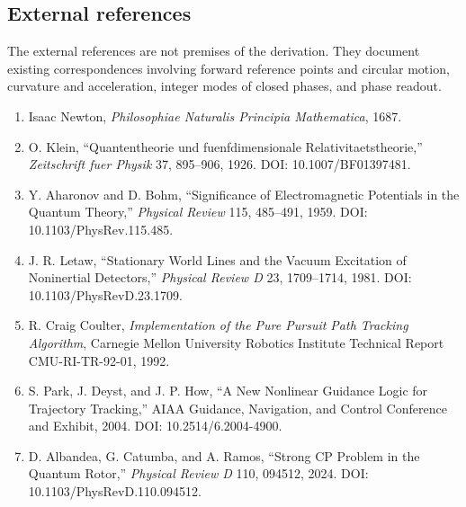 \documentclass[
  a4paper,
]{article}
\providecommand{\tightlist}{%
  \setlength{\itemsep}{0pt}\setlength{\parskip}{0pt}}
\begin{document}
\subsection{External references}\label{external-references}

The external references are not premises of the derivation. They
document existing correspondences involving forward reference points and
circular motion, curvature and acceleration, integer modes of closed
phases, and phase readout.

\begin{enumerate}
\def\labelenumi{\arabic{enumi}.}
\setcounter{enumi}{5}
\tightlist
\item
  Isaac Newton, \emph{Philosophiae Naturalis Principia Mathematica},
  1687.
\item
  O. Klein, ``Quantentheorie und fuenfdimensionale
  Relativitaetstheorie,'' \emph{Zeitschrift fuer Physik} 37, 895--906,
  1926. DOI: 10.1007/BF01397481.
\item
  Y. Aharonov and D. Bohm, ``Significance of Electromagnetic Potentials
  in the Quantum Theory,'' \emph{Physical Review} 115, 485--491, 1959.
  DOI: 10.1103/PhysRev.115.485.
\item
  J. R. Letaw, ``Stationary World Lines and the Vacuum Excitation of
  Noninertial Detectors,'' \emph{Physical Review D} 23, 1709--1714,
  1981. DOI: 10.1103/PhysRevD.23.1709.
\item
  R. Craig Coulter, \emph{Implementation of the Pure Pursuit Path
  Tracking Algorithm}, Carnegie Mellon University Robotics Institute
  Technical Report CMU-RI-TR-92-01, 1992.
\item
  S. Park, J. Deyst, and J. P. How, ``A New Nonlinear Guidance Logic for
  Trajectory Tracking,'' AIAA Guidance, Navigation, and Control
  Conference and Exhibit, 2004. DOI: 10.2514/6.2004-4900.
\item
  D. Albandea, G. Catumba, and A. Ramos, ``Strong CP Problem in the
  Quantum Rotor,'' \emph{Physical Review D} 110, 094512, 2024. DOI:
  10.1103/PhysRevD.110.094512.
\end{enumerate}
\end{document}
